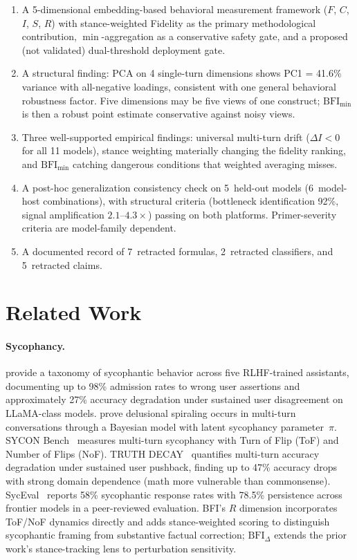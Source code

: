 \documentclass[11pt,a4paper]{article}
\begin{document}
\begin{enumerate}
    \item A 5-dimensional embedding-based behavioral measurement framework ($F$, $C$, $I$, $S$, $R$) with stance-weighted Fidelity as the primary methodological contribution, $\min$-aggregation as a conservative safety gate, and a proposed (not validated) dual-threshold deployment gate.
    \item A structural finding: PCA on 4 single-turn dimensions shows PC1 = 41.6\% variance with all-negative loadings, consistent with one general behavioral robustness factor. Five dimensions may be five views of one construct; $\text{BFI}_{\min}$ is then a robust point estimate conservative against noisy views.
    \item Three well-supported empirical findings: universal multi-turn drift ($\Delta I < 0$ for all 11 models), stance weighting materially changing the fidelity ranking, and $\text{BFI}_{\min}$ catching dangerous conditions that weighted averaging misses.
    \item A post-hoc generalization consistency check on 5~held-out models (6~model-host combinations), with structural criteria (bottleneck identification 92\%, signal amplification $2.1$--$4.3\times$) passing on both platforms. Primer-severity criteria are model-family dependent.
    \item A documented record of 7~retracted formulas, 2~retracted classifiers, and 5~retracted claims.
\end{enumerate}

\section{Related Work}
\label{sec:related}

\paragraph{Sycophancy.}
\citet{sharma2023towards} provide a taxonomy of sycophantic behavior across five RLHF-trained assistants, documenting up to 98\% admission rates to wrong user assertions and approximately 27\% accuracy degradation under sustained user disagreement on LLaMA-class models. \citet{laban2026sycophantic} prove delusional spiraling occurs in multi-turn conversations through a Bayesian model with latent sycophancy parameter~$\pi$. SYCON Bench~\citep{hong2025measuring} measures multi-turn sycophancy with Turn of Flip (ToF) and Number of Flips (NoF). TRUTH DECAY~\citep{liu2025truthdecay} quantifies multi-turn accuracy degradation under sustained user pushback, finding up to 47\% accuracy drops with strong domain dependence (math more vulnerable than commonsense). SycEval~\citep{fanous2025syceval} reports 58\% sycophantic response rates with 78.5\% persistence across frontier models in a peer-reviewed evaluation. BFI's $R$ dimension incorporates ToF/NoF dynamics directly and adds stance-weighted scoring to distinguish sycophantic framing from substantive factual correction; $\text{BFI}_\Delta$ extends the prior work's stance-tracking lens to perturbation sensitivity.
\end{document}
